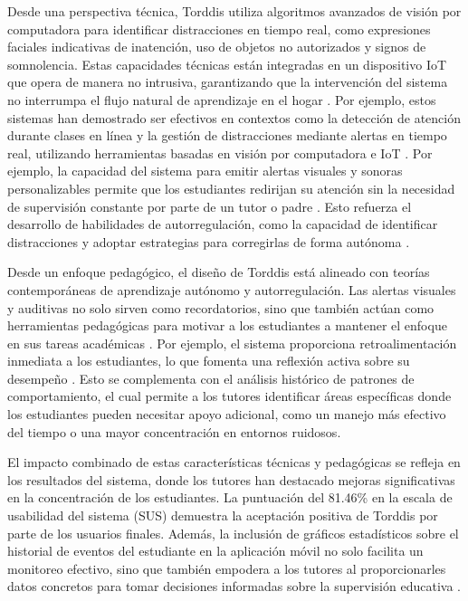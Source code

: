 \documentclass[a4paper,fleqn]{cas-sc}
\begin{document}
			 Desde una perspectiva técnica, Torddis utiliza algoritmos avanzados de visión por computadora para identificar distracciones en tiempo real, como expresiones faciales indicativas de inatención, uso de objetos no autorizados y signos de somnolencia. Estas capacidades técnicas están integradas en un dispositivo IoT que opera de manera no intrusiva, garantizando que la intervención del sistema no interrumpa el flujo natural de aprendizaje en el hogar \citep{Roy2022, Chen2022, Ucar2022Recognizing, Asish2022Detecting}. Por ejemplo, estos sistemas han demostrado ser efectivos en contextos como la detección de atención durante clases en línea y la gestión de distracciones mediante alertas en tiempo real, utilizando herramientas basadas en visión por computadora e IoT \citep{Chen2022, Ucar2022Recognizing}. Por ejemplo, la capacidad del sistema para emitir alertas visuales y sonoras personalizables permite que los estudiantes redirijan su atención sin la necesidad de supervisión constante por parte de un tutor o padre \citep{Ackermans2025Young}. Esto refuerza el desarrollo de habilidades de autorregulación, como la capacidad de identificar distracciones y adoptar estrategias para corregirlas de forma autónoma \citep{Wang2025Development}.
			 
			 Desde un enfoque pedagógico, el diseño de Torddis está alineado con teorías contemporáneas de aprendizaje autónomo y autorregulación. Las alertas visuales y auditivas no solo sirven como recordatorios, sino que también actúan como herramientas pedagógicas para motivar a los estudiantes a mantener el enfoque en sus tareas académicas \citep{Mohamed2018Implementing}. Por ejemplo, el sistema proporciona retroalimentación inmediata a los estudiantes, lo que fomenta una reflexión activa sobre su desempeño \citep{Ackermans2025Young}. Esto se complementa con el análisis histórico de patrones de comportamiento, el cual permite a los tutores identificar áreas específicas donde los estudiantes pueden necesitar apoyo adicional, como un manejo más efectivo del tiempo o una mayor concentración en entornos ruidosos.
			 
			 El impacto combinado de estas características técnicas y pedagógicas se refleja en los resultados del sistema, donde los tutores han destacado mejoras significativas en la concentración de los estudiantes. La puntuación del 81.46\% en la escala de usabilidad del sistema (SUS) demuestra la aceptación positiva de Torddis por parte de los usuarios finales. Además, la inclusión de gráficos estadísticos sobre el historial de eventos del estudiante en la aplicación móvil no solo facilita un monitoreo efectivo, sino que también empodera a los tutores al proporcionarles datos concretos para tomar decisiones informadas sobre la supervisión educativa \citep{Wang2025Development}.
			 
\end{document}
